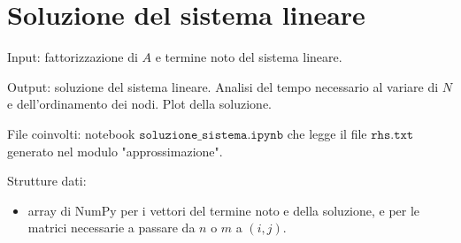 \documentclass{article}
\begin{document}
\section{Soluzione del sistema lineare}
Input: fattorizzazione di $A$ e termine noto del sistema lineare.

Output: soluzione del sistema lineare.
Analisi del tempo necessario al variare di $N$ e dell'ordinamento dei nodi.
Plot della soluzione.

File coinvolti: notebook $\texttt{soluzione\_sistema.ipynb}$ che legge il file $\texttt{rhs.txt}$ generato nel modulo "approssimazione".

Strutture dati:
\begin{itemize}
\item array di NumPy per i vettori del termine noto e della soluzione, e per le matrici necessarie a passare da $n$ o $m$ a $(i,j)$.
\end{itemize}
\end{document}
